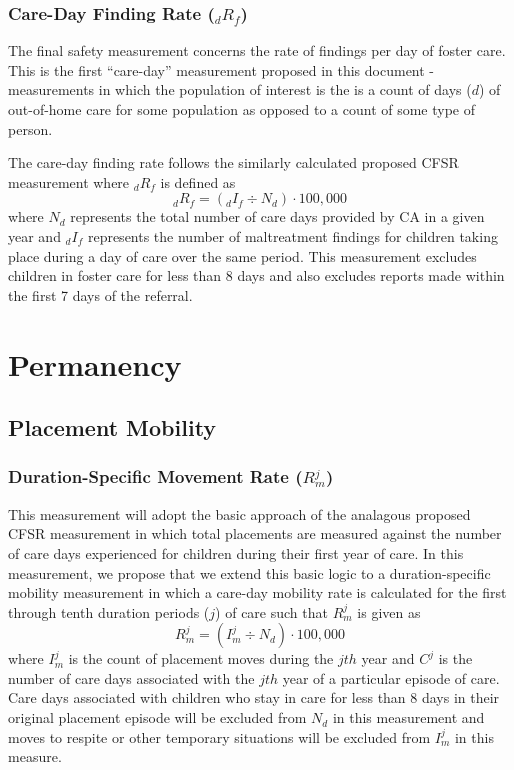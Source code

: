 \documentclass[12pt]{article}\usepackage[]{graphicx}\usepackage[]{color}
\begin{document}
\subsubsection{Care-Day Finding Rate (${}_{d}R_f$)}

The final safety measurement concerns the rate of findings per day of foster care. This is the first ``care-day'' measurement proposed in this document - measurements in which the population of interest is the is a count of days ($d$) of out-of-home care for some population as opposed to a count of some type of person.

The care-day finding rate follows the similarly calculated proposed CFSR measurement where ${}_{d}R_f$ is defined as 
\begin{equation}\label{eq:dRf}
{}_{d}R_f = ({}_{d}I_f \div N_d) \cdot 100,000
\end{equation}
where $N_d$ represents the total number of care days provided by CA in a given year and ${}_{d}I_f$ represents the number of maltreatment findings for children taking place during a day of care over the same period. This measurement excludes children in foster care for less than 8 days and also excludes reports made within the first 7 days of the referral. 

\section{Permanency}

\subsection{Placement Mobility}

\subsubsection{Duration-Specific Movement Rate ($R_m^j$)}
This measurement will adopt the basic approach of the analagous proposed CFSR measurement in which total placements are measured against the number of care days experienced for children during their first year of care. In this measurement, we propose that we extend this basic logic to a duration-specific mobility measurement in which a care-day mobility rate is calculated for the first through tenth duration periods ($j$) of care such that $R_m^j$ is given as 
\begin{equation}\label{eq:Rmj}
R_m^j = (I_m^j \div N_d) \cdot 100,000
\end{equation}
where $I_m^j$ is the count of placement moves during the $jth$ year and $C^j$ is the number of care days associated with the $jth$ year of a particular episode of care. Care days associated with children who stay in care for less than 8 days in their original placement episode will be excluded from $N_d$ in this measurement and moves to respite or other temporary situations will be excluded from $I_m^j$ in this measure. 
\end{document}
